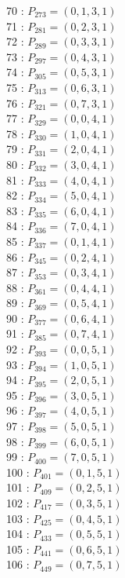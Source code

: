 \documentclass{article}
\begin{document}
{\begin{multicols}{3}
70 : $P_{273}=( 0, 1, 3, 1 )$\\
71 : $P_{281}=( 0, 2, 3, 1 )$\\
72 : $P_{289}=( 0, 3, 3, 1 )$\\
73 : $P_{297}=( 0, 4, 3, 1 )$\\
74 : $P_{305}=( 0, 5, 3, 1 )$\\
75 : $P_{313}=( 0, 6, 3, 1 )$\\
76 : $P_{321}=( 0, 7, 3, 1 )$\\
77 : $P_{329}=( 0, 0, 4, 1 )$\\
78 : $P_{330}=( 1, 0, 4, 1 )$\\
79 : $P_{331}=( 2, 0, 4, 1 )$\\
80 : $P_{332}=( 3, 0, 4, 1 )$\\
81 : $P_{333}=( 4, 0, 4, 1 )$\\
82 : $P_{334}=( 5, 0, 4, 1 )$\\
83 : $P_{335}=( 6, 0, 4, 1 )$\\
84 : $P_{336}=( 7, 0, 4, 1 )$\\
85 : $P_{337}=( 0, 1, 4, 1 )$\\
86 : $P_{345}=( 0, 2, 4, 1 )$\\
87 : $P_{353}=( 0, 3, 4, 1 )$\\
88 : $P_{361}=( 0, 4, 4, 1 )$\\
89 : $P_{369}=( 0, 5, 4, 1 )$\\
90 : $P_{377}=( 0, 6, 4, 1 )$\\
91 : $P_{385}=( 0, 7, 4, 1 )$\\
92 : $P_{393}=( 0, 0, 5, 1 )$\\
93 : $P_{394}=( 1, 0, 5, 1 )$\\
94 : $P_{395}=( 2, 0, 5, 1 )$\\
95 : $P_{396}=( 3, 0, 5, 1 )$\\
96 : $P_{397}=( 4, 0, 5, 1 )$\\
97 : $P_{398}=( 5, 0, 5, 1 )$\\
98 : $P_{399}=( 6, 0, 5, 1 )$\\
99 : $P_{400}=( 7, 0, 5, 1 )$\\
100 : $P_{401}=( 0, 1, 5, 1 )$\\
101 : $P_{409}=( 0, 2, 5, 1 )$\\
102 : $P_{417}=( 0, 3, 5, 1 )$\\
103 : $P_{425}=( 0, 4, 5, 1 )$\\
104 : $P_{433}=( 0, 5, 5, 1 )$\\
105 : $P_{441}=( 0, 6, 5, 1 )$\\
106 : $P_{449}=( 0, 7, 5, 1 )$\\

\end{multicols}}
\end{document}
